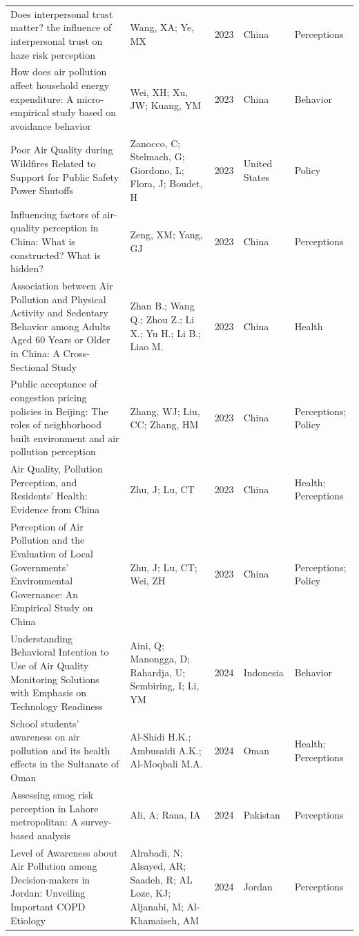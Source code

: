{\begin{longtable}[t]{p{6cm}p{3cm}lp{3cm}p{3cm}}
Does interpersonal trust matter? the influence of interpersonal trust on haze risk perception & Wang, XA; Ye, MX & 2023 & China & Perceptions\\
How does air pollution affect household energy expenditure: A micro-empirical study based on avoidance behavior & Wei, XH; Xu, JW; Kuang, YM & 2023 & China & Behavior\\
Poor Air Quality during Wildfires Related to Support for Public Safety Power Shutoffs & Zanocco, C; Stelmach, G; Giordono, L; Flora, J; Boudet, H & 2023 & United States & Policy\\
\addlinespace
Influencing factors of air-quality perception in China: What is constructed? What is hidden? & Zeng, XM; Yang, GJ & 2023 & China & Perceptions\\
Association between Air Pollution and Physical Activity and Sedentary Behavior among Adults Aged 60 Years or Older in China: A Cross-Sectional Study & Zhan B.; Wang Q.; Zhou Z.; Li X.; Yu H.; Li B.; Liao M. & 2023 & China & Health\\
Public acceptance of congestion pricing policies in Beijing: The roles of neighborhood built environment and air pollution perception & Zhang, WJ; Liu, CC; Zhang, HM & 2023 & China & Perceptions; Policy\\
Air Quality, Pollution Perception, and Residents' Health: Evidence from China & Zhu, J; Lu, CT & 2023 & China & Health; Perceptions\\
Perception of Air Pollution and the Evaluation of Local Governments' Environmental Governance: An Empirical Study on China & Zhu, J; Lu, CT; Wei, ZH & 2023 & China & Perceptions; Policy\\
\addlinespace
Understanding Behavioral Intention to Use of Air Quality Monitoring Solutions with Emphasis on Technology Readiness & Aini, Q; Manongga, D; Rahardja, U; Sembiring, I; Li, YM & 2024 & Indonesia & Behavior\\
School students' awareness on air pollution and its health effects in the Sultanate of Oman & Al-Shidi H.K.; Ambusaidi A.K.; Al-Moqbali M.A. & 2024 & Oman & Health; Perceptions\\
Assessing smog risk perception in Lahore metropolitan: A survey-based analysis & Ali, A; Rana, IA & 2024 & Pakistan & Perceptions\\
Level of Awareness about Air Pollution among Decision-makers in Jordan: Unveiling Important COPD Etiology & Alrabadi, N; Alsayed, AR; Saadeh, R; AL Loze, KJ; Aljanabi, M; Al-Khamaiseh, AM & 2024 & Jordan & Perceptions\\

\end{longtable}}
